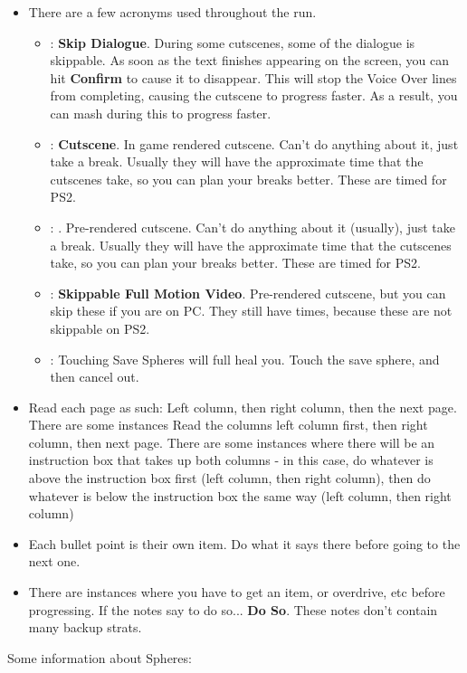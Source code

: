 \begin{itemize}
\item There are a few acronyms used throughout the run.
\begin{itemize}
	\item \sd: \textbf{Skip Dialogue}. During some cutscenes, some of the dialogue is skippable. As soon as the text finishes appearing on the screen, you can hit \textbf{Confirm} to cause it to disappear. This will stop the Voice Over lines from completing, causing the cutscene to progress faster. As a result, you can mash during this to progress faster.
	\item \cs: \textbf{Cutscene}. In game rendered cutscene. Can't do anything about it, just take a break. Usually they will have the approximate time that the cutscenes take, so you can plan your breaks better. These are timed for PS2.
	\item \fmv: . Pre-rendered cutscene. Can't do anything about it (usually), just take a break. Usually they will have the approximate time that the cutscenes take, so you can plan your breaks better. These are timed for PS2.
	\item \skippablefmv: \textbf{Skippable Full Motion Video}. Pre-rendered cutscene, but you can skip these if you are on PC. They still have times, because these are not skippable on PS2.
	\item \save: Touching Save Spheres will full heal you. Touch the save sphere, and then cancel out.
\end{itemize}
\item Read each page as such: Left column, then right column, then the next page. There are some instances Read the columns left column first, then right column, then next page. There are some instances where there will be an instruction box that takes up both columns - in this case, do whatever is above the instruction box first (left column, then right column), then do whatever is below the instruction box the same way (left column, then right column)
\item Each bullet point is their own item. Do what it says there before going to the next one.
\item There are instances where you have to get an item, or overdrive, etc before progressing. If the notes say to do so... \textbf{Do So}. These notes don't contain many backup strats.
\end{itemize}

Some information about Spheres:

